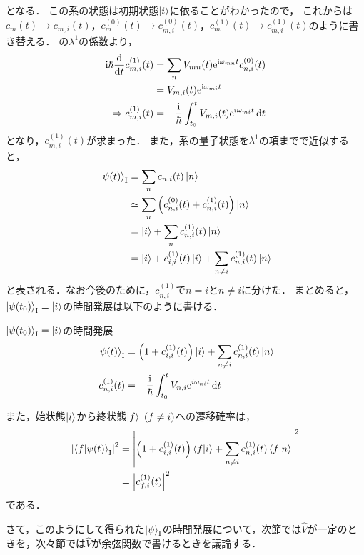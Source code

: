 \documentclass{report}
\begin{document}
  となる．
  この系の状態は初期状態$\ket{i}$に依ることがわかったので，
  これからは$c_m(t) \to c_{m, i}(t)$，$c_m^{(0)}(t) \to c_{m, i}^{(0)}(t)$，$c_m^{(1)}(t) \to c_{m, i}^{(1)}(t)$のように書き替える．
  の$\lambda^1$の係数より，
  \begin{align}
    \mathrm{i}\hbar\dv{t}c_{m, i}^{(1)}(t)& = \sum_{n}V_{mn}(t)\mathrm{e}^{\mathrm{i}\omega_{mn}t}c_{n, i}^{(0)}(t)\\
    & = V_{m, i}(t)\mathrm{e}^{\mathrm{i}\omega_{mi}t} \\
    \Rightarrow c_{m, i}^{(1)}(t)& = -\frac{\mathrm{i}}{\hbar}\int_{t_0}^{t}V_{m, i}(t)\mathrm{e}^{i\omega_{mi}t}\dd{t}\label{cmi1t-progress}
  \end{align}
  となり，$c_{m, i}^{(1)}(t)$が求まった．
  また，系の量子状態を$\lambda^1$の項までで近似すると，
  \begin{align}
    \ket{\psi(t)}_{\mathrm{I}} &= \sum_{n}c_{n, i}(t)\ket{n} \\ 
    &\simeq \sum_{n} \qty(c_{n, i}^{(0)}(t) + c_{n, i}^{(1)}(t))\ket{n} \\ 
    &= \ket{i} + \sum_{n}c_{n, i}^{(1)}(t)\ket{n} \\ 
    &= \ket{i} + c_{i, i}^{(1)}(t)\ket{i} + \sum_{n\neq i}c_{n, i}^{(1)}(t)\ket{n}
  \end{align}
  と表される．なお今後のために，$c_{n, i}^{(1)}$で$n = i$と$n \neq i$に分けた．
  まとめると，$\ket{\psi(t_0)}_{\mathrm{I}} = \ket{i}$の時間発展は以下のように書ける．
  \begin{itembox}[l]{$\ket{\psi(t_0)}_{\mathrm{I}} = \ket{i}$の時間発展}
    \begin{align}
      \ket{\psi(t)}_{\mathrm{I}}& = \qty(1 + c_{i, i}^{(1)}(t))\ket{i} + \sum_{n\neq i}c_{n, i}^{(1)}(t)\ket{n}\\
      c_{n, i}^{(1)}(t) &= -\frac{\mathrm{i}}{\hbar}\int_{t_0}^{t}V_{n, i}\mathrm{e}^{i\omega_{ni}t}\dd{t}
    \end{align}
  \end{itembox}
  また，始状態$\ket{i}$から終状態$\ket{f}\ (f\neq i)$への遷移確率は，
  \begin{align}
    \abs{\braket{f}{\psi(t)}_{\mathrm{I}}}^2 &= \abs{\qty(1 + c_{i, i}^{(1)}(t))\braket{f}{i} + \sum_{n\neq i}c_{n, i}^{(1)}(t)\braket{f}{n}}^2 \\ 
    &= \abs{c_{f, i}^{(1)}(t)}^2
  \end{align}
  である．
  \par
  さて，このようにして得られた$\ket{\psi}_{\mathrm{I}}$の時間発展について，次節では$\hat{V}$が一定のときを，次々節では$\hat{V}$が余弦関数で書けるときを議論する．
\end{document}
